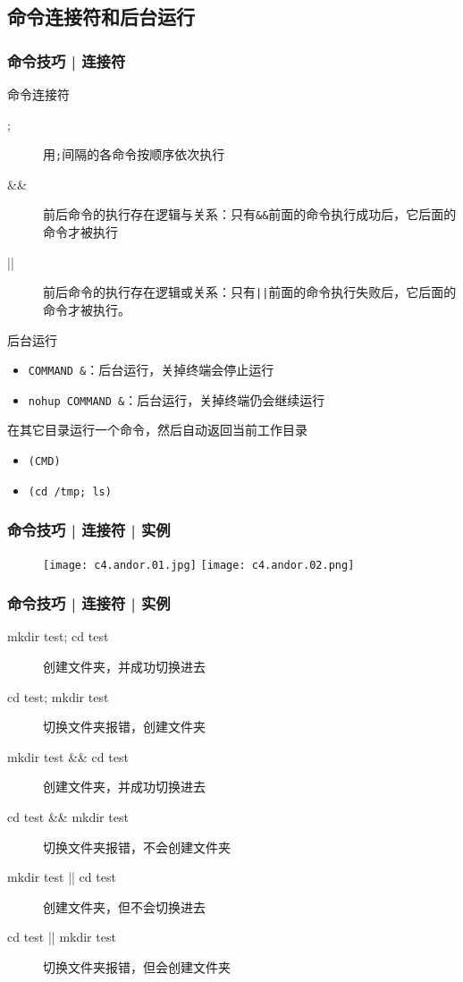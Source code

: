 \subsection{命令连接符和后台运行}
\begin{frame}[fragile]
  \frametitle{命令技巧 | \alert{连接符}}
  \begin{block}{命令连接符}
    \begin{description}
      \item[;] 用\verb|;|间隔的各命令按顺序依次执行
      \item[\&\&] 前后命令的执行存在逻辑与关系：只有\verb|&&|前面的命令执行成功后，它后面的命令才被执行
      \item[||] 前后命令的执行存在逻辑或关系：只有\verb=||=前面的命令执行失败后，它后面的命令才被执行。
    \end{description}
  \end{block}
  \pause
  \begin{block}{后台运行}
    \begin{itemize}
      \item \verb|COMMAND &|：后台运行，关掉终端会停止运行
      \item \verb|nohup COMMAND &|：后台运行，关掉终端仍会继续运行
    \end{itemize}
  \end{block}
  \pause
  \begin{block}{在其它目录运行一个命令，然后自动返回当前工作目录}
    \begin{itemize}
      \item \verb|(CMD)|
      \item \verb|(cd /tmp; ls)|
    \end{itemize}
  \end{block}
\end{frame}

\begin{frame}
  \frametitle{命令技巧 | 连接符 | 实例}
  \begin{figure}
  \centering
    \texttt{[image: c4.andor.01.jpg]}
    \vspace{0.3cm}
    \texttt{[image: c4.andor.02.png]}
  \end{figure}
\end{frame}

\begin{frame}[fragile]
  \frametitle{命令技巧 | 连接符 | 实例}
  \begin{description}
     \item[mkdir test; cd test] 创建文件夹，并成功切换进去
     \item[cd test; mkdir test] 切换文件夹报错，创建文件夹
     \item[mkdir test \&\& cd test] 创建文件夹，并成功切换进去
     \item[cd test \&\& mkdir test] 切换文件夹报错，不会创建文件夹
     \item[mkdir test || cd test] 创建文件夹，但不会切换进去
     \item[cd test || mkdir test] 切换文件夹报错，但会创建文件夹
  \end{description}
\end{frame}

